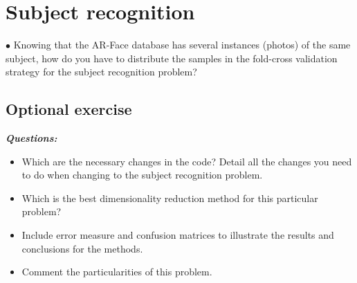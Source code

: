 \section{Subject recognition}

\question

$ \bullet $ Knowing that the AR-Face database has several instances (photos) of the
same subject, how do you have to distribute the samples in the fold-cross
validation strategy for the subject recognition problem?

\subsection{Optional exercise}

{\bfseries \emph{Questions:}}

\begin{itemize}
\item Which are the necessary changes in the code? Detail all the changes you
need to do when changing to the subject recognition problem.
\item Which is the best dimensionality reduction method for this particular problem?
\item Include error measure and confusion matrices to illustrate the results and
conclusions for the methods.
\item Comment the particularities of this problem.
\end{itemize}